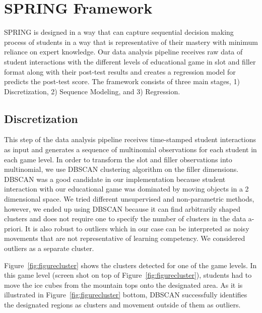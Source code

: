 \documentclass{sigchi}
\def\algname{SPRING\xspace}
\begin{document}
\section{SPRING Framework}

\algname is designed in a way that can capture sequential decision making process of students in a way that is representative of their mastery with minimum reliance on expert knowledge. Our data analysis pipeline receives raw data of student interactions with the different levels of educational game in slot and filler format along with their post-test results and creates a regression model for predicts the post-test score. 
The framework consists of three main stages, 1) Discretization, 2) Sequence Modeling, and 3) Regression.

\subsection{Discretization}
This step of the data analysis pipeline receives time-stamped student interactions as input and generates a sequence of multinomial observations for each student in each game level.
In order to transform the slot and filler observations into multinomial, we use DBSCAN clustering algorithm \cite{ester1996density} on the filler dimensions. 
DBSCAN was a good candidate in our implementation because student interaction with our educational game was dominated by moving objects in a 2 dimensional space.
We tried different unsupervised and non-parametric methods, however, we ended up using DBSCAN because it can find arbitrarily shaped clusters and does not require one to specify the number of clusters in the data a-priori. 
It is also robust to outliers which in our case can be interpreted as noisy movements that are not representative of learning competency. 
We considered outliers as a separate cluster.

Figure~\ref{fig:figurecluster} shows the clusters detected for one of the game levels. 
In this game level (screen shot on top of Figure~\ref{fig:figurecluster}), students had to move the ice cubes from the mountain tops onto the designated area. As it is illustrated in Figure~\ref{fig:figurecluster} bottom, DBSCAN successfully identifies the designated regions as clusters and movement outside of them as outliers.
\end{document}
